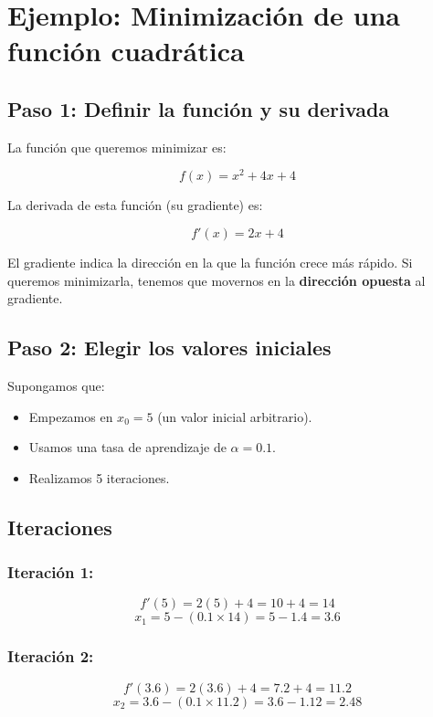 	\section{Ejemplo: Minimización de una función cuadrática}
	
	\subsection{Paso 1: Definir la función y su derivada}
	
	La función que queremos minimizar es:
	
	\[
	f(x) = x^2 + 4x + 4
	\]
	
	La derivada de esta función (su gradiente) es:
	
	\[
	f'(x) = 2x + 4
	\]
	
	El gradiente indica la dirección en la que la función crece más rápido. Si queremos minimizarla, tenemos que movernos en la \textbf{dirección opuesta} al gradiente.
	
	\subsection{Paso 2: Elegir los valores iniciales}
	
	Supongamos que:
	
	\begin{itemize}
		\item Empezamos en \(x_0 = 5\) (un valor inicial arbitrario).
		\item Usamos una tasa de aprendizaje de \(\alpha = 0.1\).
		\item Realizamos 5 iteraciones.
	\end{itemize}
	
	\subsection{Iteraciones}
	
	\subsubsection{Iteración 1:}
	\[
	f'(5) = 2(5) + 4 = 10 + 4 = 14
	\]
	\[
	x_1 = 5 - (0.1 \times 14) = 5 - 1.4 = 3.6
	\]
	
	\subsubsection{Iteración 2:}
	\[
	f'(3.6) = 2(3.6) + 4 = 7.2 + 4 = 11.2
	\]
	\[
	x_2 = 3.6 - (0.1 \times 11.2) = 3.6 - 1.12 = 2.48
	\]
	
